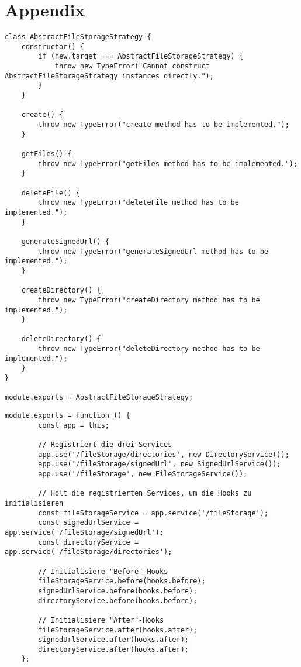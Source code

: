 \appendix
\section{Appendix}
\label{sec:appendix}

\begin{lstlisting}[caption=Abstract file storage strategy, label=strategyinterface]
class AbstractFileStorageStrategy {
	constructor() {
		if (new.target === AbstractFileStorageStrategy) {
			throw new TypeError("Cannot construct AbstractFileStorageStrategy instances directly.");
		}
	}
	
	create() {
		throw new TypeError("create method has to be implemented.");
	}
	
	getFiles() {
		throw new TypeError("getFiles method has to be implemented.");
	}
	
	deleteFile() {
		throw new TypeError("deleteFile method has to be implemented.");
	}
	
	generateSignedUrl() {
		throw new TypeError("generateSignedUrl method has to be implemented.");
	}
	
	createDirectory() {
		throw new TypeError("createDirectory method has to be implemented.");
	}
	
	deleteDirectory() {
		throw new TypeError("deleteDirectory method has to be implemented.");
	}
}

module.exports = AbstractFileStorageStrategy;
\end{lstlisting}

\begin{lstlisting}[caption=Registrieren des FileStorage Services, label=filestorageindex]
	module.exports = function () {
		const app = this;
		
		// Registriert die drei Services
		app.use('/fileStorage/directories', new DirectoryService());
		app.use('/fileStorage/signedUrl', new SignedUrlService());
		app.use('/fileStorage', new FileStorageService());
		
		// Holt die registrierten Services, um die Hooks zu initialisieren
		const fileStorageService = app.service('/fileStorage');
		const signedUrlService = app.service('/fileStorage/signedUrl');
		const directoryService = app.service('/fileStorage/directories');
		
		// Initialisiere "Before"-Hooks
		fileStorageService.before(hooks.before);
		signedUrlService.before(hooks.before);
		directoryService.before(hooks.before);
		
		// Initialisiere "After"-Hooks
		fileStorageService.after(hooks.after);
		signedUrlService.after(hooks.after);
		directoryService.after(hooks.after);
	};
\end{lstlisting}

\clearpage